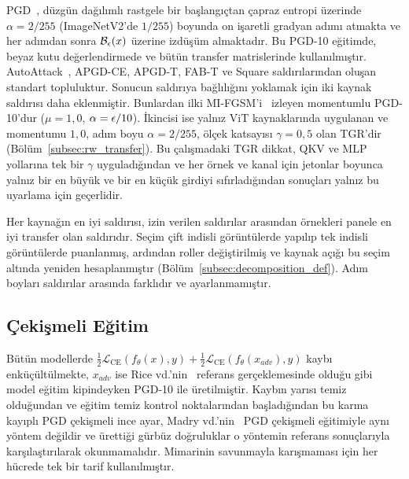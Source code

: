 PGD~\cite{madry2018towards}, düzgün dağılımlı rastgele bir başlangıçtan çapraz entropi üzerinde $\alpha = 2/255$ (ImageNetV2'de $1/255$) boyunda on işaretli gradyan adımı atmakta ve her adımdan sonra $\mathcal{B}_\epsilon(x)$ üzerine izdüşüm almaktadır. Bu PGD-10 eğitimde, beyaz kutu değerlendirmede ve bütün transfer matrislerinde kullanılmıştır. AutoAttack~\cite{croce2020reliable}, APGD-CE, APGD-T, FAB-T ve Square saldırılarından oluşan standart topluluktur. Sonucun saldırıya bağlılığını yoklamak için iki kaynak saldırısı daha eklenmiştir. Bunlardan ilki MI-FGSM'i~\cite{dong2018boosting} izleyen momentumlu PGD-10'dur ($\mu = 1{,}0$, $\alpha = \epsilon/10$). İkincisi ise yalnız ViT kaynaklarında uygulanan ve momentumu $1{,}0$, adım boyu $\alpha = 2/255$, ölçek katsayısı $\gamma = 0{,}5$ olan TGR'dir~\cite{zhang2023tgr} (Bölüm~\ref{subsec:rw_transfer}). Bu çalışmadaki TGR dikkat, QKV ve MLP yollarına tek bir $\gamma$ uyguladığından ve her örnek ve kanal için jetonlar boyunca yalnız bir en büyük ve bir en küçük girdiyi sıfırladığından sonuçları yalnız bu uyarlama için geçerlidir.

Her kaynağın en iyi saldırısı, izin verilen saldırılar arasından örnekleri panele en iyi transfer olan saldırıdır. Seçim çift indisli görüntülerde yapılıp tek indisli görüntülerde puanlanmış, ardından roller değiştirilmiş ve kaynak açığı bu seçim altında yeniden hesaplanmıştır (Bölüm~\ref{subsec:decomposition_def}). Adım boyları saldırılar arasında farklıdır ve ayarlanmamıştır.

\subsection{Çekişmeli Eğitim}
\label{subsec:training}

Bütün modellerde $\tfrac12\mathcal{L}_{\mathrm{CE}}(f_\theta(x), y) + \tfrac12\mathcal{L}_{\mathrm{CE}}(f_\theta(x_{adv}), y)$ kaybı enküçültülmekte, $x_{adv}$ ise Rice vd.'nin~\cite{rice2020overfitting} referans gerçeklemesinde olduğu gibi model eğitim kipindeyken PGD-10 ile üretilmiştir. Kaybın yarısı temiz olduğundan ve eğitim temiz kontrol noktalarından başladığından bu karma kayıplı PGD çekişmeli ince ayar, Madry vd.'nin~\cite{madry2018towards} PGD çekişmeli eğitimiyle aynı yöntem değildir ve ürettiği gürbüz doğruluklar o yöntemin referans sonuçlarıyla karşılaştırılarak okunmamalıdır. Mimarinin savunmayla karışmaması için her hücrede tek bir tarif kullanılmıştır.

